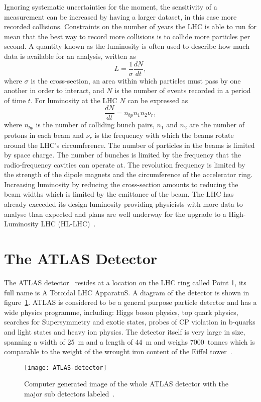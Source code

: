 Ignoring systematic uncertainties for the moment, the sensitivity of a
measurement can be increased by having a larger dataset, in this case more
recorded collisions. Constraints on the number of years the LHC is able to run
for mean that the best way to record more collisions is to collide more
particles per second. A quantity known as the luminosity is often used to
describe how much data is available for an analysis, written as
\begin{equation}
  \label{eq:luminosity} L = \frac{1}{\sigma}\frac{dN}{dt},
\end{equation} where $\sigma$ is the cross-section, an area within which
particles must pass by one another in order to interact, and $N$ is the number
of events recorded in a period of time $t$. For luminosity at the LHC $N$ can be
expressed as
\begin{equation}
  \label{eq:lhc-lumi} \frac{dN}{dt} = n_{bp}n_{1}n_{2}\nu_{r},
\end{equation} where $n_{bp}$ is the number of colliding bunch pairs, $n_{1}$
and $n_{2}$ are the number of protons in each beam and $\nu_r$ is the frequency
with which the beams rotate around the LHC's circumference. The number of
particles in the beams is limited by space charge. The number of bunches is
limited by the frequency that the radio-frequency cavities can operate at. The
revolution frequency is limited by the strength of the dipole magnets and the
circumference of the accelerator ring. Increasing luminosity by reducing the
cross-section amounts to reducing the beam widths which is limited by the
emittance of the beam. The LHC has already exceeded its design luminosity
providing physicists with more data to analyse than expected and plans are well
underway for the upgrade to a High-Luminosity LHC (HL-LHC)~\cite{hilumi-tdr}.

\section{The ATLAS Detector}%
\label{sec:atlas}

The ATLAS detector~\cite{ATLAS} resides at a location on the LHC ring called
Point 1, its full name is A Toroidal LHC ApparatuS. A diagram of the detector is
shown in figure~\ref{fig:ATLAS-det}. ATLAS is considered to be a general purpose
particle detector and has a wide physics programme, including: Higgs boson physics,
top quark physics, searches for Supersymmetry and exotic states, probes of CP
violation in b-quarks and light states and heavy ion physics. The detector
itself is very large in size, spanning a width of 25~m and a length of 44~m and
weighs 7000~tonnes which is comparable to the weight of the wrought iron content
of the Eiffel tower~\cite{Eiffel-weight}.
\begin{figure}[ht]
  \centering
  \texttt{[image: ATLAS-detector]}
  \caption[The ATLAS Detector]{Computer generated image of the whole ATLAS
    detector with the major sub detectors labeled~\cite{ATLAS-det-fig}.}%
  \label{fig:ATLAS-det}
\end{figure}


